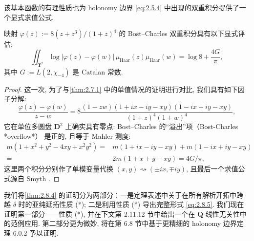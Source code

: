 该基本函数的有理性质也为 holonomy 边界 \eqref{eq:2.5.4} 中出现的双重积分提供了一个显式求值公式.

\begin{lemma}\label{lem:2.11.7}
映射 \(\varphi(z) := 8(z+z^3)/(1+z)^4\) 的 Bost--Charles 双重积分具有以下显式评估:
\begin{equation}\label{eq:2.11.8}
  \iint_{\mathbf{T}^2} \log \lvert\varphi(z) - \varphi(w)\rvert \,\mu_{\text{Haar}}(z)\mu_{\text{Haar}}(w) = \log 8 + \frac{4G}{\pi},
\end{equation}
其中 \(G := L(2, \chi_{-4})\) 是 Catalan 常数.
\end{lemma}

\begin{proof}
这一次, 为了与\autoref{thm:2.7.1} 中的单值情况的证明进行对比, 我们具有如下因子分解:
\begin{equation}\label{eq:2.11.9}
\frac{\varphi(z) - \varphi(w)}{z - w} = 8 \frac{(1 - zw)(1 + ix - iy - xy)(1 - ix + iy - xy)}{(1 + z)^4 (1 + w)^4},
\end{equation}
它在单位多圆盘 \(\mathbf{D}^2\) 上确实具有零点: Bost--Charles 的“溢出”项（Bost-Charles *overflow*） \cite[§ 5]{BC22} 是正的, 且等于 Mahler 测度:
\[
\begin{aligned}
m(1+x^2+y^2-4xy+x^2y^2) = {} & m(1+ix-iy-xy) + m(1-ix+iy-xy) \\
= {} & 2m(1+x+y-xy) = 4G/\pi,
\end{aligned}
\]
这里两个积分分别作了单模变量代换 \((x, y) \rightsquigarrow (\pm ix, \mp iy)\), 且最后一个求值公式源自 Smyth \cite{Boy98}.
\end{proof}

我们将\autoref{thm:2.8.4} 的证明分为两部分：一是定理表述中关于在所有解析开拓中跨越 \(\delta\) 时的亚纯延拓性质 (*); 二是利用性质 (*) 导出完整形式 \eqref{eq:2.8.5}. 我们现在证明第一部分——性质 (*), 并在下文第 2.11.12 节中给出一个在 \(\mathbf{Q}\)-线性无关性中的范例应用. 第二部分更为微妙, 将在第 6.8 节中基于更精细的 holonomy 边界定理 6.0.2 予以证明.


